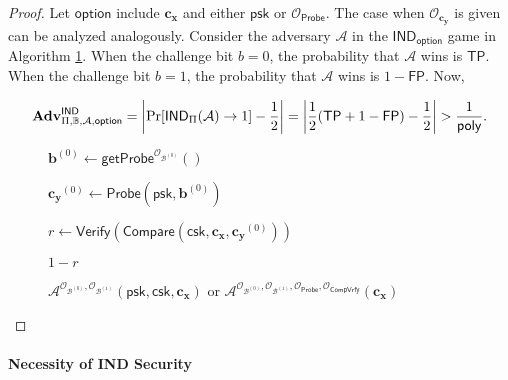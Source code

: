 \begin{proof}

Let $\textsf{option}$ include $\mathbf{c_x}$ and either $\textsf{psk}$ or $\mathcal{O}_{\textsf{Probe}}$. The case when $\mathcal{O}_{\mathbf{c_y}}$ is given can be analyzed analogously. Consider the adversary $\mathcal{A}$ in the $\textsf{IND}_{\textsf{option}}$ game in Algorithm \ref{alg:ind-tp-fp}. When the challenge bit $b = 0$, the probability that $\mathcal{A}$ wins is $\textsf{TP}$. When the challenge bit $b = 1$, the probability that $\mathcal{A}$ wins is $1 - \textsf{FP}$. Now, 

\[
	\mathbf{Adv}_{\Pi, \mathbb{B}, \mathcal{A}, \textsf{option}}^{\textsf{IND}} = \left| \Pr[ \textsf{IND}_\Pi(\mathcal{A}) \to 1 ] - \frac{1}{2} \right| = \left| \frac{1}{2} (\textsf{TP} + 1 - \textsf{FP}) - \frac{1}{2} \right| > \frac{1}{\mathsf{poly}}.
\]

\begin{figure}[h]
\centering

	\begin{minipage}[t]{0.85\textwidth}
	\begin{algorithm}[H]
	\caption{$\mathcal{A}^{\mathcal{O}_{\mathcal{B}^{(0)}}, \mathcal{O}_{\mathcal{B}^{(1)}}} (\textsf{psk}, \textsf{csk}, \mathbf{c_x})$ or $\mathcal{A}^{\mathcal{O}_{\mathcal{B}^{(0)}}, \mathcal{O}_{\mathcal{B}^{(1)}}, \mathcal{O}_{\textsf{Probe}}, \mathcal{O}_{\textsf{CompVrfy}} } (\mathbf{c_x})$}
	\label{alg:ind-tp-fp}
	\begin{algorithmic}[1]

		\State $\mathbf{b}^{(0)} \gets \textsf{getProbe}^{\mathcal{O}_{\mathcal{B}^{(0)}}}()$
		
		\State $\mathbf{c_y}^{(0)} \gets \textsf{Probe}(\textsf{psk}, \mathbf{b}^{(0)})$ 
		
		\State $r \gets \textsf{Verify}( \textsf{Compare}(\textsf{csk}, \mathbf{c_x}, \mathbf{c_y}^{(0)}) ) $ 
		
		\State \Return $1 - r$
	\end{algorithmic}
	\end{algorithm}
	\end{minipage}

\end{figure}

\end{proof}


\paragraph{Necessity of IND Security}

